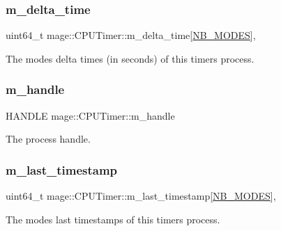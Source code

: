 \subsubsection{\texorpdfstring{m\+\_\+delta\+\_\+time}{m\_delta\_time}}
{\footnotesize\ttfamily uint64\+\_\+t mage\+::\+C\+P\+U\+Timer\+::m\+\_\+delta\+\_\+time\mbox{[}\hyperlink{classmage_1_1_c_p_u_timer_a17f6aa71c97aef46fea51190709e4c14ab63e6023ec0bea89568ebb2b98728b77}{N\+B\+\_\+\+M\+O\+D\+ES}\mbox{]}\hspace{0.3cm}{\ttfamily [mutable]}, {\ttfamily [private]}}

The modes\textquotesingle{} delta times (in seconds) of this timer\textquotesingle{}s process. \hypertarget{classmage_1_1_c_p_u_timer_a95b8ac18c050ed25293c8a923087369a}{}\label{classmage_1_1_c_p_u_timer_a95b8ac18c050ed25293c8a923087369a} 
\subsubsection{\texorpdfstring{m\+\_\+handle}{m\_handle}}
{\footnotesize\ttfamily H\+A\+N\+D\+LE mage\+::\+C\+P\+U\+Timer\+::m\+\_\+handle\hspace{0.3cm}{\ttfamily [private]}}

The process handle. \hypertarget{classmage_1_1_c_p_u_timer_a6ff1dc5a56461359a699ba8b17d636a8}{}\label{classmage_1_1_c_p_u_timer_a6ff1dc5a56461359a699ba8b17d636a8} 
\subsubsection{\texorpdfstring{m\+\_\+last\+\_\+timestamp}{m\_last\_timestamp}}
{\footnotesize\ttfamily uint64\+\_\+t mage\+::\+C\+P\+U\+Timer\+::m\+\_\+last\+\_\+timestamp\mbox{[}\hyperlink{classmage_1_1_c_p_u_timer_a17f6aa71c97aef46fea51190709e4c14ab63e6023ec0bea89568ebb2b98728b77}{N\+B\+\_\+\+M\+O\+D\+ES}\mbox{]}\hspace{0.3cm}{\ttfamily [mutable]}, {\ttfamily [private]}}

The modes\textquotesingle{} last timestamps of this timer\textquotesingle{}s process. \hypertarget{classmage_1_1_c_p_u_timer_ac5fdb38a70c74815231b5efd8d746be1}{}\label{classmage_1_1_c_p_u_timer_ac5fdb38a70c74815231b5efd8d746be1} 
